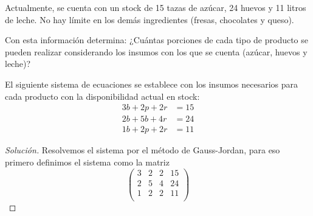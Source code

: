 \documentclass[12pt]{article}
\newenvironment{solution}{\begin{proof}[Solución]}{\end{proof}}
\begin{document}
\begin{enumerate}
    Actualmente, se cuenta con un stock de 15 tazas de azúcar, 24 huevos y 11 litros de leche. No hay límite en los demás ingredientes (fresas, chocolates y queso).

    Con esta información determina: ¿Cuántas porciones de cada tipo de producto se pueden realizar considerando los insumos con los que se cuenta (azúcar, huevos y leche)?

    El siguiente sistema de ecuaciones se establece con los insumos necesarios para cada producto con la disponibilidad actual en stock:
    \begin{align*}
        3b + 2p +2r &= 15 \\
        2b + 5b + 4r &= 24 \\
        1b + 2p +2r &= 11
    \end{align*}
    \begin{solution}
        Resolvemos el sistema por el método de Gauss-Jordan, para eso primero definimos el sistema como la matriz \[\left(\begin{array}{ccc|c}  
            3 & 2 & 2 & 15 \\  
            2 & 5 & 4 & 24  \\
            1 & 2 & 2 & 11 \\ 
        \end{array}\right)\]
    \end{solution}
\end{enumerate}



\end{document}

